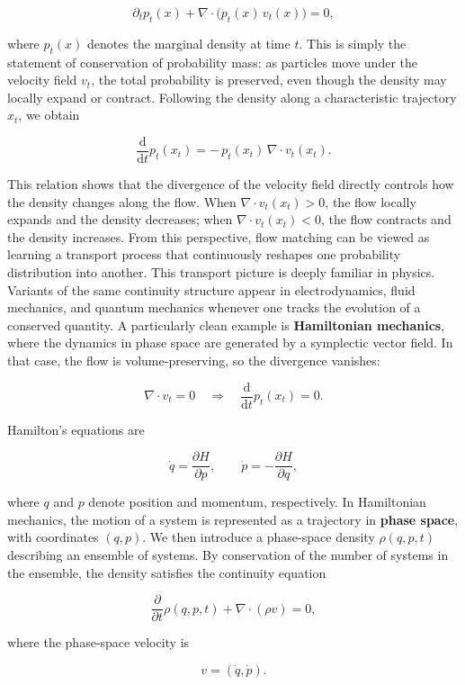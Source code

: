 \[
\partial_t p_t(x) + \nabla \cdot \bigl(p_t(x)\, v_t(x)\bigr) = 0,
\label{keyeq:flow-continuity}
\]

where \(p_t(x)\) denotes the marginal density at time \(t\). This is simply the statement of conservation of probability mass: as particles move under the velocity field \(v_t\), the total probability is preserved, even though the density may locally expand or contract. Following the density along a characteristic trajectory \(x_t\), we obtain

\[
\frac{\mathrm{d}}{\mathrm{d}t} p_t(x_t)
=
-\, p_t(x_t)\, \nabla \cdot v_t(x_t).
\]

This relation shows that the divergence of the velocity field directly controls how the density changes along the flow. When \(\nabla \cdot v_t(x_t) > 0\), the flow locally expands and the density decreases; when \(\nabla \cdot v_t(x_t) < 0\), the flow contracts and the density increases. From this perspective, flow matching can be viewed as learning a transport process that continuously reshapes one probability distribution into another. This transport picture is deeply familiar in physics. Variants of the same continuity structure appear in electrodynamics, fluid mechanics, and quantum mechanics whenever one tracks the evolution of a conserved quantity. A particularly clean example is \textbf{Hamiltonian mechanics}, where the dynamics in phase space are generated by a symplectic vector field. In that case, the flow is volume-preserving, so the divergence vanishes:

\[
\nabla \cdot v_t = 0
\quad \Longrightarrow \quad
\frac{\mathrm{d}}{\mathrm{d}t} p_t(x_t)=0.
\]

Hamilton's equations are

\[
\dot q = \frac{\partial H}{\partial p},
\qquad
\dot p = -\frac{\partial H}{\partial q},
\]

where \(q\) and \(p\) denote position and momentum, respectively. In Hamiltonian mechanics, the motion of a system is represented as a trajectory in \textbf{phase space}, with coordinates \((q, p)\). We then introduce a phase-space density \(\rho(q, p, t)\) describing an ensemble of systems. By conservation of the number of systems in the ensemble, the density satisfies the continuity equation

\[
\frac{\partial}{\partial t}\rho(q, p, t) + \nabla \cdot (\rho v) = 0,
\]

where the phase-space velocity is

\[
v = (\dot q, \dot p).
\]

